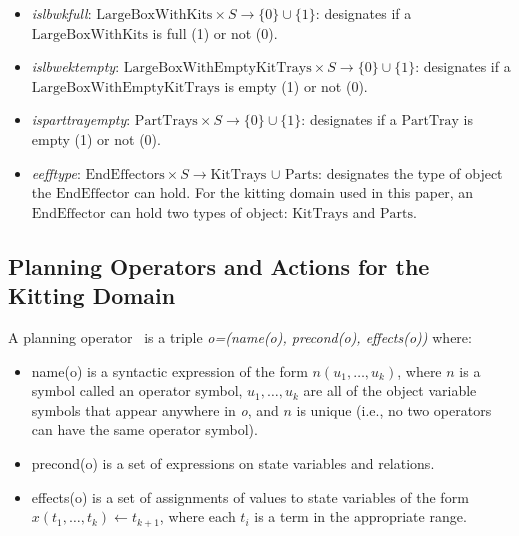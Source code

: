 \begin{itemize}
\item \emph{islbwkfull}: $\mathrm{LargeBoxWithKits}\times S\rightarrow \lbrace 0\rbrace \cup \lbrace 1\rbrace$: designates if a $\mathrm{LargeBoxWithKits}$ is full (1) or not (0).

\item \emph{islbwektempty}: $\mathrm{LargeBoxWithEmptyKitTrays}\times S\rightarrow \lbrace 0\rbrace \cup \lbrace 1\rbrace$: designates if a $\mathrm{LargeBoxWithEmptyKitTrays}$ is empty (1) or not (0).

\item \emph{isparttrayempty}: $\mathrm{PartTrays}\times S\rightarrow \lbrace 0\rbrace \cup \lbrace 1\rbrace$: designates if a $\mathrm{PartTray}$ is empty (1) or not (0).

\item \emph{eefftype}: $\mathrm{EndEffectors}\times S \rightarrow\mathrm{KitTrays}$ $\cup$ $\mathrm{Parts}$: designates the type of object the $\mathrm{EndEffector}$ can hold. For the kitting domain used in this paper, an $\mathrm{EndEffector}$ can hold two types of object: $\mathrm{KitTrays}$ and $\mathrm{Parts}$.
\end{itemize}



\subsection{Planning Operators and Actions for the Kitting Domain}

A planning operator~\cite{NAU.2004} is a triple \textit{o=(name(o), precond(o), effects(o))}
where:
\begin{itemize}
\item name(o) is a syntactic expression of the form $n(u_1,\dots,u_k)$, where $n$ is a symbol
called an operator symbol, $u_1,\dots,u_k$ are all of the object variable symbols that
appear anywhere in \textit{o}, and $n$ is unique (i.e., no two operators can have the
same operator symbol).
\item precond(o) is a set of expressions on state variables and relations.
\item effects(o) is a set of assignments of values to state variables of the form
$x(t_1,\dots,t_k)\leftarrow t_{k+1}$, where each $t_i$ is a term in the appropriate range.
\end{itemize}

